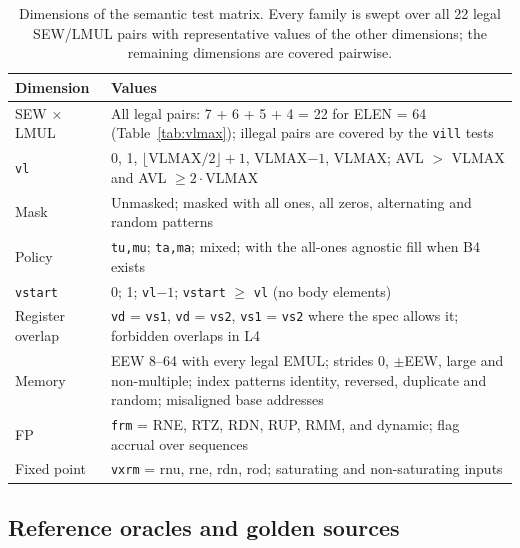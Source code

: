 \documentclass[11pt]{article}
\begin{document}
\begin{table}[H]
\centering\small
\caption{Dimensions of the semantic test matrix. Every family is swept over all 22 legal SEW/LMUL
pairs with representative values of the other dimensions; the remaining dimensions are covered
pairwise.}\label{tab:matrix}
\begin{tabularx}{\textwidth}{@{}L{3.2cm}Y@{}}
\toprule
Dimension & Values \\
\midrule
SEW $\times$ LMUL & All legal pairs: 7 + 6 + 5 + 4 = 22 for ELEN = 64 (Table~\ref{tab:vlmax}); illegal pairs are covered by the \texttt{vill} tests \\
\texttt{vl} & 0, 1, $\lfloor\mathrm{VLMAX}/2\rfloor+1$, VLMAX$-1$, VLMAX; AVL $>$ VLMAX and AVL $\ge 2\cdot$VLMAX \\
Mask & Unmasked; masked with all ones, all zeros, alternating and random patterns \\
Policy & \texttt{tu,mu}; \texttt{ta,ma}; mixed; with the all-ones agnostic fill when B4 exists \\
\texttt{vstart} & 0; 1; \texttt{vl}$-1$; \texttt{vstart} $\ge$ \texttt{vl} (no body elements) \\
Register overlap & \texttt{vd} = \texttt{vs1}, \texttt{vd} = \texttt{vs2}, \texttt{vs1} = \texttt{vs2} where the spec allows it; forbidden overlaps in L4 \\
Memory & EEW 8--64 with every legal EMUL; strides 0, $\pm$EEW, large and non-multiple; index patterns identity, reversed, duplicate and random; misaligned base addresses \\
FP & \texttt{frm} = RNE, RTZ, RDN, RUP, RMM, and dynamic; flag accrual over sequences \\
Fixed point & \texttt{vxrm} = rnu, rne, rdn, rod; saturating and non-saturating inputs \\
\bottomrule
\end{tabularx}
\end{table}

\subsection{Reference oracles and golden sources}\label{sec:oracles}
\end{document}
